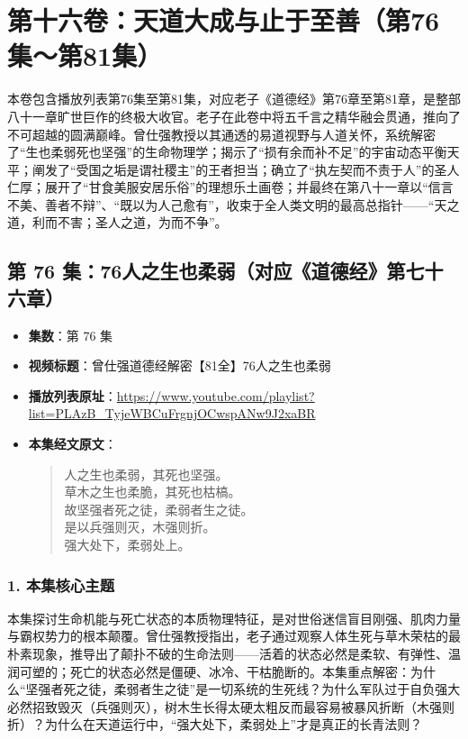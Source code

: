 \section*{第十六卷：天道大成与止于至善（第76集～第81集）}

本卷包含播放列表第76集至第81集，对应老子《道德经》第76章至第81章，是整部八十一章旷世巨作的终极大收官。老子在此卷中将五千言之精华融会贯通，推向了不可超越的圆满巅峰。曾仕强教授以其通透的易道视野与人道关怀，系统解密了“生也柔弱死也坚强”的生命物理学；揭示了“损有余而补不足”的宇宙动态平衡天平；阐发了“受国之垢是谓社稷主”的王者担当；确立了“执左契而不责于人”的圣人仁厚；展开了“甘食美服安居乐俗”的理想乐土画卷；并最终在第八十一章以“信言不美、善者不辩”、“既以为人己愈有”，收束于全人类文明的最高总指针——“天之道，利而不害；圣人之道，为而不争”。

\clearpage

\subsection{第 76 集：76人之生也柔弱（对应《道德经》第七十六章）}
\label{sec:ep76}

\begin{itemize}
    \item \textbf{集数}：第 76 集
    \item \textbf{视频标题}：曾仕强道德经解密【81全】76人之生也柔弱
    \item \textbf{播放列表原址}：\url{https://www.youtube.com/playlist?list=PLAzB_TyjeWBCuFrgnjOCwspANw9J2xaBR}
    \item \textbf{本集经文原文}：
    \begin{quote}\kaishu
    人之生也柔弱，其死也坚强。\\
    草木之生也柔脆，其死也枯槁。\\
    故坚强者死之徒，柔弱者生之徒。\\
    是以兵强则灭，木强则折。\\
    强大处下，柔弱处上。
    \end{quote}
\end{itemize}

\subsubsection{1. 本集核心主题}
本集探讨生命机能与死亡状态的本质物理特征，是对世俗迷信盲目刚强、肌肉力量与霸权势力的根本颠覆。曾仕强教授指出，老子通过观察人体生死与草木荣枯的最朴素现象，推导出了颠扑不破的生命法则——活着的状态必然是柔软、有弹性、温润可塑的；死亡的状态必然是僵硬、冰冷、干枯脆断的。本集重点解密：为什么“坚强者死之徒，柔弱者生之徒”是一切系统的生死线？为什么军队过于自负强大必然招致毁灭（兵强则灭），树木生长得太硬太粗反而最容易被暴风折断（木强则折）？为什么在天道运行中，“强大处下，柔弱处上”才是真正的长青法则？

